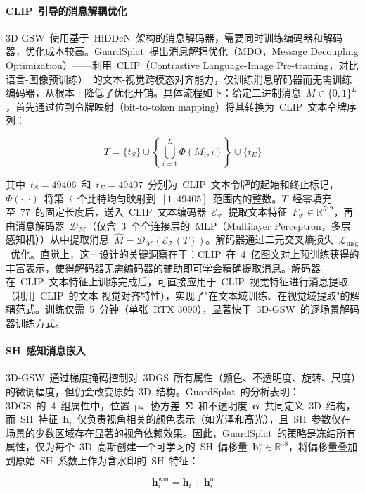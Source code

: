 \paragraph{CLIP~引导的消息解耦优化}
3D-GSW~使用基于~HiDDeN~架构的消息解码器，需要同时训练编码器和解码器，优化成本较高。GuardSplat~提出消息解耦优化（MDO，Message Decoupling Optimization）——利用~CLIP（Contrastive Language-Image Pre-training，对比语言-图像预训练）~的文本-视觉跨模态对齐能力，仅训练消息解码器而无需训练编码器，从根本上降低了优化开销。具体流程如下：给定二进制消息~$M \in \{0,1\}^L$，首先通过位到令牌映射（bit-to-token mapping）将其转换为~CLIP~文本令牌序列：

\begin{equation}
  T = \{t_S\} \cup \left\{\bigcup_{i=1}^{L}\varPhi(M_i, i)\right\} \cup \{t_E\}
\end{equation}

其中~$t_S = 49406$~和~$t_E = 49407$~分别为~CLIP~文本令牌的起始和终止标记，$\varPhi(\cdot,\cdot)$~将第~$i$~个比特均匀映射到~$[1, 49405]$~范围内的整数。$T$~经零填充至~77~的固定长度后，送入~CLIP~文本编码器~$\mathcal{E}_\mathcal{T}$~提取文本特征~$F_\mathcal{T} \in \mathbb{R}^{512}$，再由消息解码器~$\mathcal{D}_\mathcal{M}$（仅含~3~个全连接层的~MLP（Multilayer Perceptron，多层感知机））从中提取消息~$\hat{M} = \mathcal{D}_\mathcal{M}(\mathcal{E}_\mathcal{T}(T))$。解码器通过二元交叉熵损失~$\mathcal{L}_{\text{msg}}$~优化。直觉上，这一设计的关键洞察在于：CLIP~在~4~亿图文对上预训练获得的丰富表示，使得解码器无需编码器的辅助即可学会精确提取消息。解码器在~CLIP~文本特征上训练完成后，可直接应用于~CLIP~视觉特征进行消息提取（利用~CLIP~的文本-视觉对齐特性），实现了"在文本域训练、在视觉域提取"的解耦范式。训练仅需~5~分钟（单张~RTX 3090），显著快于~3D-GSW~的逐场景解码器训练方式。

\paragraph{SH~感知消息嵌入}
3D-GSW~通过梯度掩码控制对~3DGS~所有属性（颜色、不透明度、旋转、尺度）的微调幅度，但仍会改变原始~3D~结构。GuardSplat~的分析表明：3DGS~的~4~组属性中，位置~$\boldsymbol{\mu}$、协方差~$\boldsymbol{\Sigma}$~和不透明度~$\boldsymbol{\alpha}$~共同定义~3D~结构，而~SH~特征~$\boldsymbol{h}_i$~仅负责视角相关的颜色表示（如光泽和高光），且~SH~参数仅在场景的少数区域存在显著的视角依赖效果。因此，GuardSplat~的策略是冻结所有属性，仅为每个~3D~高斯创建一个可学习的~SH~偏移量~$\boldsymbol{h}^o_i \in \mathbb{R}^{48}$，将偏移量叠加到原始~SH~系数上作为含水印的~SH~特征：

\begin{equation}
  \boldsymbol{h}_i^{\text{wm}} = \boldsymbol{h}_i + \boldsymbol{h}^o_i
\end{equation}

